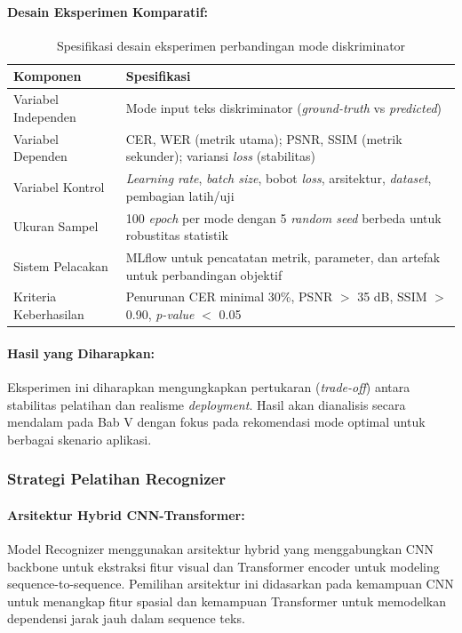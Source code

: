 \documentclass[12pt,a4paper]{article}
\begin{document}
\paragraph{Desain Eksperimen Komparatif:}
\begin{table}[H]
\centering
\caption{Spesifikasi desain eksperimen perbandingan mode diskriminator}
\label{tab:experiment-design-disc}
\small
\begin{tabular}{|l|p{10cm}|}
\hline
\textbf{Komponen} & \textbf{Spesifikasi} \\ \hline
Variabel Independen & Mode input teks diskriminator (\textit{ground-truth} vs \textit{predicted}) \\ \hline
Variabel Dependen & CER, WER (metrik utama); PSNR, SSIM (metrik sekunder); variansi \textit{loss} (stabilitas) \\ \hline
Variabel Kontrol & \textit{Learning rate}, \textit{batch size}, bobot \textit{loss}, arsitektur, \textit{dataset}, pembagian latih/uji \\ \hline
Ukuran Sampel & 100 \textit{epoch} per mode dengan 5 \textit{random seed} berbeda untuk robustitas statistik \\ \hline
Sistem Pelacakan & MLflow untuk pencatatan metrik, parameter, dan artefak untuk perbandingan objektif \\ \hline
Kriteria Keberhasilan & Penurunan CER minimal 30\%, PSNR $>$ 35 dB, SSIM $>$ 0.90, \textit{p-value} $<$ 0.05 \\ \hline
\end{tabular}
\end{table}

\paragraph{Hasil yang Diharapkan:}
Eksperimen ini diharapkan mengungkapkan pertukaran (\textit{trade-off}) antara stabilitas pelatihan dan realisme \textit{deployment}. Hasil akan dianalisis secara mendalam pada Bab V dengan fokus pada rekomendasi mode optimal untuk berbagai skenario aplikasi.

\subsubsection{Strategi Pelatihan Recognizer}
\paragraph{Arsitektur Hybrid CNN-Transformer:}
Model Recognizer menggunakan arsitektur hybrid yang menggabungkan CNN backbone untuk ekstraksi fitur visual dan Transformer encoder untuk modeling sequence-to-sequence. Pemilihan arsitektur ini didasarkan pada kemampuan CNN untuk menangkap fitur spasial dan kemampuan Transformer untuk memodelkan dependensi jarak jauh dalam sequence teks.
\end{document}
